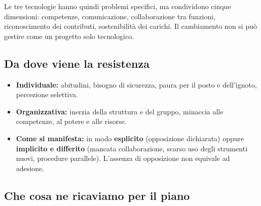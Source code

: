 \documentclass[11pt,a4paper]{article}
\begin{document}
Le tre tecnologie hanno quindi problemi specifici, ma condividono cinque dimensioni: competenze, comunicazione, collaborazione tra funzioni, riconoscimento dei contributi, sostenibilità dei carichi. Il cambiamento non si può gestire come un progetto solo tecnologico.

\subsection{Da dove viene la resistenza}\label{sec:6.3}
\begin{itemize}
\item \textbf{Individuale:} abitudini, bisogno di sicurezza, paura per il posto e dell'ignoto, percezione selettiva.
\item \textbf{Organizzativa:} inerzia della struttura e del gruppo, minaccia alle competenze, al potere e alle risorse.
\item \textbf{Come si manifesta:} in modo \textbf{esplicito} (opposizione dichiarata) oppure \textbf{implicito e differito} (mancata collaborazione, scarso uso degli strumenti nuovi, procedure parallele). L'assenza di opposizione non equivale ad adesione.
\end{itemize}

\subsection{Che cosa ne ricaviamo per il piano}\label{sec:6.4}
\end{document}
